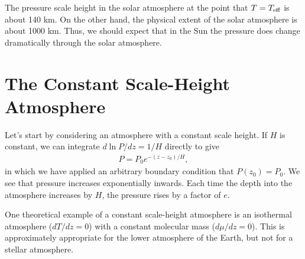 The pressure scale height in the solar atmosphere at the point that $T = T_\mathrm{eff}$ is about 140 km. On the other hand, the physical extent of the solar atmosphere is about 1000 km. Thus, we should expect that in the Sun the pressure does change dramatically through the solar atmosphere.


\newslide

\section{The Constant Scale-Height Atmosphere}

Let’s start by considering an atmosphere with a constant scale height. If $H$ is constant, we can integrate $d\ln P/dz = 1/H$ directly to give
\begin{align}
P = P_0 e^{-(z-z_0)/H},
\end{align}
in which we have applied an arbitrary boundary condition that $P(z_0) = P_0$. We see that pressure increases exponentially inwards. Each time the depth into the atmosphere increases by $H$, the pressure rises by a factor of $e$.

One theoretical example of a constant scale-height atmosphere is an isothermal atmosphere ($dT/dz = 0$) with a constant molecular mass ($d\mu/dz = 0$). This is approximately appropriate for the lower atmosphere of the Earth, but not for a stellar atmosphere.


